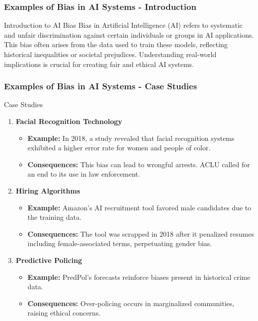 \documentclass{beamer}
\begin{document}
\begin{frame}[fragile]
    \frametitle{Examples of Bias in AI Systems - Introduction}
    \begin{block}{Introduction to AI Bias}
        Bias in Artificial Intelligence (AI) refers to systematic and unfair discrimination against certain individuals or groups in AI applications. 
        This bias often arises from the data used to train these models, reflecting historical inequalities or societal prejudices. 
        Understanding real-world implications is crucial for creating fair and ethical AI systems.
    \end{block}
\end{frame}

\begin{frame}[fragile]
    \frametitle{Examples of Bias in AI Systems - Case Studies}
    \begin{block}{Case Studies}
        \begin{enumerate}
            \item \textbf{Facial Recognition Technology}
                \begin{itemize}
                    \item \textbf{Example:} In 2018, a study revealed that facial recognition systems exhibited a higher error rate for women and people of color.
                    \item \textbf{Consequences:} This bias can lead to wrongful arrests. ACLU called for an end to its use in law enforcement.
                \end{itemize}
            \item \textbf{Hiring Algorithms}
                \begin{itemize}
                    \item \textbf{Example:} Amazon's AI recruitment tool favored male candidates due to the training data.
                    \item \textbf{Consequences:} The tool was scrapped in 2018 after it penalized resumes including female-associated terms, perpetuating gender bias.
                \end{itemize}
            \item \textbf{Predictive Policing}
                \begin{itemize}
                    \item \textbf{Example:} PredPol's forecasts reinforce biases present in historical crime data.
                    \item \textbf{Consequences:} Over-policing occurs in marginalized communities, raising ethical concerns.
                \end{itemize}
        \end{enumerate}
    \end{block}
\end{frame}
\end{document}
